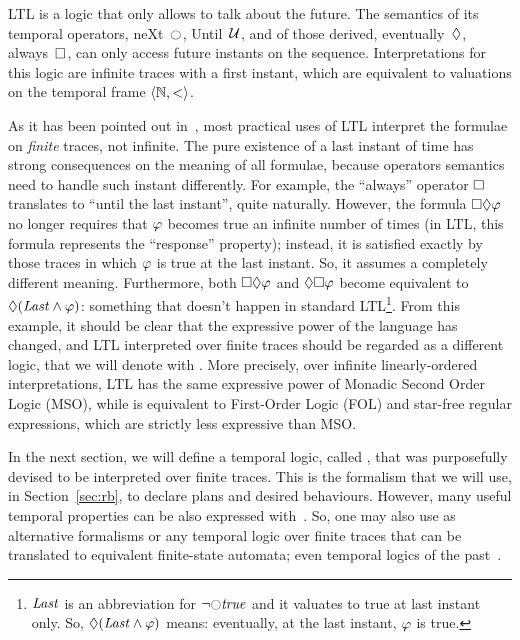 LTL is a logic that only allows to talk about the future. The semantics of its
temporal operators, neXt~$\lnext$, Until~$\mathcal{U}$, and of those derived,
eventually~$\lozenge$, always~$\square$, can only access future instants on
the sequence. Interpretations for this logic are infinite traces with a first
instant, which are equivalent to valuations on the temporal frame $\langle \mathbb{N},
< \rangle$.

As it has been pointed out in~\cite{bib:ltlf-ldlf}, most practical uses of LTL
interpret the formulae on \emph{finite} traces, not infinite. The pure
existence of a last instant of time has strong consequences on the meaning of
all formulae, because operators semantics need to handle such instant
differently.  For example, the ``always'' operator $\square$ translates to
``until the last instant'', quite naturally. However, the formula
$\square\lozenge \varphi$ no longer requires that $\varphi$ becomes true
an infinite number of times (in LTL, this formula represents the ``response''
property); instead, it is satisfied exactly by those traces in which
$\varphi$ is true at the last instant. So, it assumes a completely different
meaning.  Furthermore, both $\square\lozenge \varphi$ and
$\lozenge\square \varphi$ become equivalent to $\lozenge (\text{\textit{Last}}
\land \varphi)$: something that doesn't happen in standard LTL\footnote{
	$\text{\textit{Last}}$ is an abbreviation for $\lnot \lnext \true$ and it valuates
	to true at last instant only. So, $\lozenge (\text{\textit{Last}} \land
	\varphi)$ means: eventually, at the last instant, $\varphi$ is true.}.
From this example, it should be clear that the expressive power of the
language has changed, and LTL interpreted over finite traces should be
regarded as a different logic, that we will denote with \ltl{}.  More
precisely, over infinite linearly-ordered interpretations, LTL has the same
expressive power of Monadic Second Order Logic (MSO), while \ltl{} is
equivalent to First-Order Logic (FOL) and star-free regular expressions, which
are strictly less expressive than MSO.

In the next section, we will define a temporal logic, called \ldl{}, that was
purposefully devised to be interpreted over finite traces. This is the
formalism that we will use, in Section~\ref{sec:rb}, to declare plans and
desired behaviours. However, many useful temporal properties can be also
expressed with~\ltl{}. So, one may also use as alternative formalisms \ltl{}
or any temporal logic over finite traces that can be translated to equivalent
finite-state automata; even temporal logics of the
past~\cite{bib:nmrdp-logic-first}.


